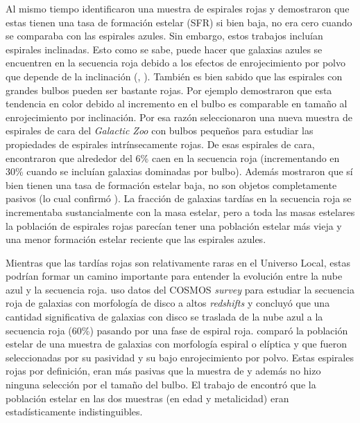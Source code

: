 \bigskip

\noindent Al mismo tiempo \citep{wolf2009} identificaron una muestra de espirales rojas y demostraron que estas tienen una tasa
de formación estelar (SFR) si bien baja, no era cero cuando se comparaba con las espirales azules.
Sin embargo, estos trabajos incluían espirales inclinadas. Esto como se sabe, puede hacer que galaxias azules se encuentren en la
secuencia roja debido a los efectos de enrojecimiento por polvo que depende de la inclinación (\citep{maller2009}, \citep{masters2010}).
También es bien sabido que las espirales con grandes bulbos pueden ser bastante rojas. Por ejemplo \citep{masters2010}
demostraron que esta tendencia en color debido al incremento en el bulbo es comparable en tamaño al enrojecimiento por inclinación.
Por esa razón \citep{masters2010} seleccionaron una nueva muestra de espirales de cara del \textsl{Galactic Zoo} con bulbos pequeños para
estudiar las propiedades  de espirales intrínsecamente rojas.
De esas espirales de cara, encontraron que alrededor del 6\% caen en la secuencia roja
(incrementando en 30\% cuando se incluían galaxias dominadas por bulbo). Además mostraron que sí bien tienen una tasa de formación estelar baja, no son objetos completamente pasivos (lo cual confirmó \cite{cortese2012}). La fracción de galaxias tardías en la secuencia roja se incrementaba sustancialmente con la masa estelar, pero a toda las masas estelares la población de espirales rojas parecían tener una población estelar más vieja y una menor formación estelar reciente que las espirales azules.

\bigskip

\noindent Mientras que las tardías rojas son relativamente raras en el Universo Local, estas podrían formar un camino importante para entender la evolución entre la nube azul y la secuencia roja. \citep{bundy2010} uso datos del COSMOS \textsl{survey} \citep{cosmos2007} para estudiar la secuencia roja de galaxias con morfología de disco a altos \textsl{redshifts} y concluyó que una cantidad significativa de galaxias con disco se traslada de la nube azul a la secuencia roja (60\%) pasando por una fase de espiral roja. \citep{robaina2012} comparó la población estelar de una muestra de galaxias con morfología espiral o elíptica y que fueron seleccionadas por su pasividad y su bajo enrojecimiento por polvo. Estas espirales rojas por definición, eran más pasivas que la muestra de \citep{masters2010} y además no hizo ninguna selección por el tamaño del bulbo. El trabajo de \citep{robaina2012} encontró que la población estelar en las dos muestras (en edad y metalicidad) eran estadísticamente indistinguibles.


